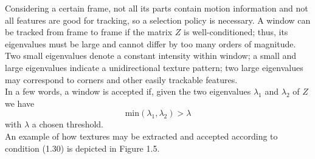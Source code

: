 \documentclass[a4paper, onecolumn]{report}
\begin{document}
Considering a certain frame, not all its parts contain motion information and not all features are good for tracking, so a selection policy is necessary. A window can be tracked from frame to frame if the matrix $Z$ is well-conditioned; thus, its eigenvalues must be large and cannot differ by too many orders of magnitude. Two small eigenvalues denote a constant intensity within window; a small and large eigenvalues indicate a unidirectional texture pattern; two large eigenvalues may correspond to corners and other easily trackable features. \\
In a few words, a window is accepted if, given the two eigenvalues $\lambda_1$ and $\lambda_2$ of $Z$ we have 
\begin{equation}
	\mbox{min}(\lambda_1, \lambda_2) > \lambda
\end{equation}
with $\lambda$ a chosen threshold.\\
An example of how textures may be extracted and accepted according to condition (1.30) is depicted in Figure 1.5.
\end{document}
